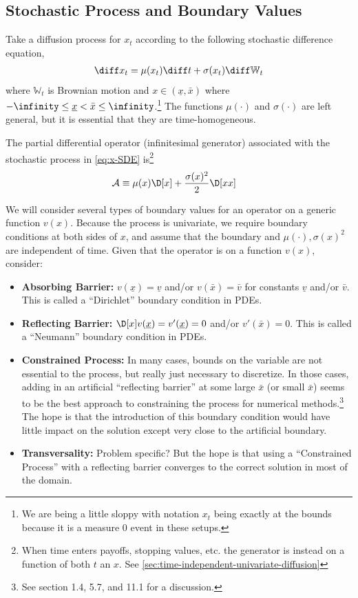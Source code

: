 \documentclass[11pt]{etk-article}
\begin{document}
\subsection{Stochastic Process and Boundary Values}
Take a diffusion process for $x_t$ according to the following stochastic difference equation,
\begin{align}
\diff x_t = \mu(x_t)\diff t + \sigma(x_t)\diff\mathbb{W}_t\label{eq:x-SDE}
\end{align}
where $\mathbb{W}_t$ is Brownian motion and $x \in (\underline{x}, \bar{x})$ where $-\infinity \leq \underline{x} < \bar{x} \leq \infinity$.\footnote{We are being a little sloppy with notation $x_t$ being exactly at the bounds because it is a measure $0$ event in these setups.}  The functions $\mu(\cdot)$ and $\sigma(\cdot)$ are left general, but it is essential that they are time-homogeneous.

The partial differential operator (infinitesimal generator) associated with the stochastic process in \cref{eq:x-SDE} is\footnote{When time enters payoffs, stopping values, etc. the generator is instead on a function of both $t$ an $x$.  See \cref{sec:time-independent-univariate-diffusion}}
\begin{align}
	\mathcal{A} &\equiv \mu(x)\D[x] + \frac{\sigma(x)^2}{2}\D[xx]\label{eq:A-generator-univariate-diffusion}
\end{align}

We will consider several types of boundary values for an operator on a generic function $v(x)$.  Because the process is univariate, we require boundary conditions at both sides of $x$, and assume that the boundary and $\mu(\cdot), \sigma(x)^2$ are independent of time.  Given that the operator is on a function $v(x)$, consider:
\begin{itemize}
	\item \textbf{Absorbing Barrier:}   $v(\underline{x}) = \underline{v}$ and/or $v(\bar{x}) = \bar{v}$ for constants $\underline{v}$ and/or $\bar{v}$.  This is called a ``Dirichlet'' boundary condition in PDEs. 
	\item \textbf{Reflecting Barrier:} $\D[x]v(\underline{x}) = v'(\underline{x})=0$ and/or $v'(\bar{x}) = 0$.  This is called a ``Neumann'' boundary condition in PDEs. 
	\item \textbf{Constrained Process:}  In many cases, bounds on the variable are not essential to the process, but really just necessary to discretize.  In those cases, adding in an artificial ``reflecting barrier'' at some large $\bar{x}$ (or small $\bar{x}$) seems to be the best approach to constraining the process for numerical methods.\footnote{See \cite{KushnerDupuis2001} section 1.4, 5.7, and 11.1 for a discussion.}  The hope is that the introduction of this boundary condition would have little impact on the solution except very close to the artificial boundary.
	\item \textbf{Transversality:} Problem specific?  But the hope is that using a ``Constrained Process'' with a reflecting barrier converges to the correct solution in most of the domain.
\end{itemize}
\end{document}
